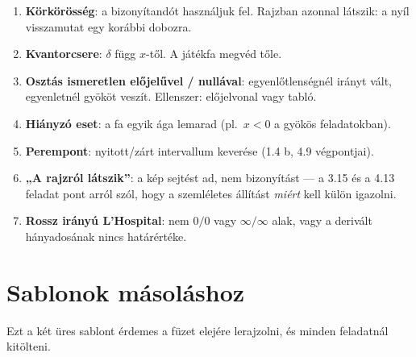 \documentclass[11pt,a4paper]{article}
\theoremstyle{definition}
\begin{document}
\begin{enumerate}[nosep,leftmargin=*]
  \item \textbf{Körkörösség}: a bizonyítandót használjuk fel. Rajzban azonnal látszik:
        a nyíl visszamutat egy korábbi dobozra.
  \item \textbf{Kvantorcsere}: $\delta$ függ $x$-től. A játékfa megvéd tőle.
  \item \textbf{Osztás ismeretlen előjelűvel / nullával}: egyenlőtlenségnél irányt vált,
        egyenletnél gyököt veszít. Ellenszer: előjelvonal vagy tabló.
  \item \textbf{Hiányzó eset}: a fa egyik ága lemarad (pl.\ $x<0$ a gyökös feladatokban).
  \item \textbf{Perempont}: nyitott/zárt intervallum keverése (1.4 b, 4.9 végpontjai).
  \item \textbf{„A rajzról látszik”}: a kép sejtést ad, nem bizonyítást --- a
        3.15 és a 4.13 feladat pont arról szól, hogy a szemléletes állítást
        \emph{miért} kell külön igazolni.
  \item \textbf{Rossz irányú L'Hospital}: nem $0/0$ vagy $\infty/\infty$ alak, vagy a
        derivált hányadosának nincs határértéke.
\end{enumerate}

\section{Sablonok másoláshoz}

Ezt a két üres sablont érdemes a füzet elejére lerajzolni, és minden feladatnál kitölteni.

\begin{center}
\end{center}
\end{document}
